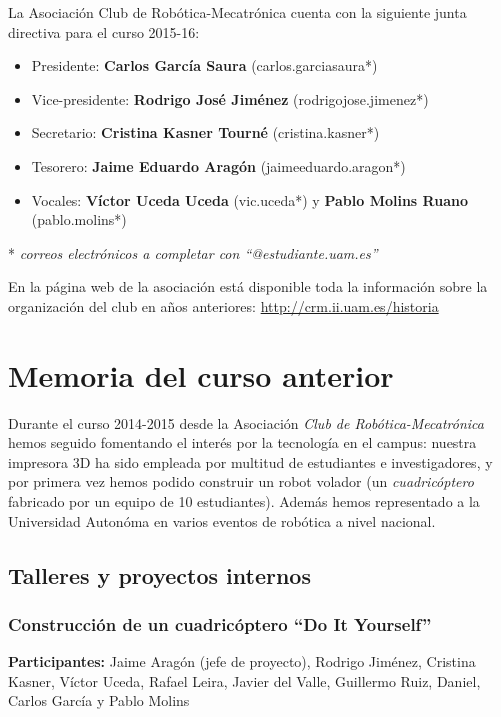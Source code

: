 \documentclass[12pt,twoside]{report}
\begin{document}
La Asociación Club de Robótica-Mecatrónica cuenta con la siguiente junta directiva para el curso 2015-16:

\begin{itemize}
\item Presidente: \textbf{Carlos García Saura} (carlos.garciasaura*)
\item Vice-presidente: \textbf{Rodrigo José Jiménez} (rodrigojose.jimenez*)
\item Secretario: \textbf{Cristina Kasner Tourné} (cristina.kasner*)
\item Tesorero: \textbf{Jaime Eduardo Aragón} (jaimeeduardo.aragon*)
\item Vocales: \textbf{Víctor Uceda Uceda} (vic.uceda*) y \textbf{Pablo Molins Ruano} (pablo.molins*)
\end{itemize}

* \textit{correos electrónicos a completar con ``@estudiante.uam.es''}

En la página web de la asociación está disponible toda la información sobre la organización del club en años anteriores:
\url{http://crm.ii.uam.es/historia}


\clearpage{\pagestyle{empty}\cleardoublepage}







\chapter{Memoria del curso anterior}

Durante el curso 2014-2015 desde la Asociación \emph{Club de Robótica-Mecatrónica} hemos seguido fomentando el interés por la tecnología en el campus: nuestra impresora 3D ha sido empleada por multitud de estudiantes e investigadores, y por primera vez hemos podido construir un robot volador (un \emph{cuadricóptero} fabricado por un equipo de 10 estudiantes).
Además hemos representado a la Universidad Autonóma en varios eventos de robótica a nivel nacional.


\section{Talleres y proyectos internos}

\subsection{Construcción de un cuadricóptero ``Do It Yourself''}
\textbf{Participantes:} Jaime Aragón (jefe de proyecto), Rodrigo Jiménez, Cristina Kasner, Víctor Uceda, Rafael Leira, Javier del Valle, Guillermo Ruiz, Daniel, Carlos García y Pablo Molins
\end{document}
